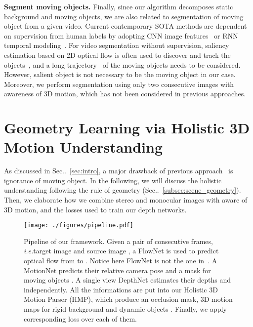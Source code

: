 \documentclass[runningheads]{llncs}
\makeatletter
\newcommand{\secref}[1]{Sec\onedot~\ref{#1}}
\DeclareRobustCommand\onedot{\futurelet\@let@token\@onedot}
\def\onedot{\ifx\@let@token.\else.\null\fi\xspace}
\def\ie{\emph{i.e.}}
\makeatother
\begin{document}
\noindent\textbf{Segment moving objects.}
Finally, since our algorithm decomposes static background and moving objects, we are also related to segmentation of moving object from a given video. 
Current contemporary SOTA methods are dependent on supervision from human labels by adopting CNN image features~\cite{fragkiadaki2015learning,yoon2017pixel} or RNN temporal modeling~\cite{tokmakov2017learning}. 
For video segmentation without supervision, saliency estimation based on 2D optical flow is often used to discover and track the objects~\cite{wang2018saliency,faktor2014video,yang2017spatio}, and a long trajectory~\cite{brox2010object,kim2018face} of the moving objects needs to be considered. However, salient object is not necessary to be the moving object in our case. Moreover, we perform segmentation using only two consecutive images with awareness of 3D motion, which has not been considered in previous approaches. 










 
\section{Geometry Learning via Holistic 3D Motion Understanding}
\label{sec:approach}
As discussed in \secref{sec:intro}, a major drawback of previous approach~\cite{zhou2017unsupervised,yang2018cvpr} is ignorance of moving object. In the following, we will discuss the holistic understanding following the rule of geometry (\secref{subsec:scene_geometry}). Then, we elaborate how we combine stereo and monocular images with aware of 3D motion, and the losses used to train our depth networks.



\begin{figure*}[t]
\centering
\texttt{[image: ./figures/pipeline.pdf]}
\caption{Pipeline of our framework. Given a pair of consecutive frames, \ie target image  and source image , a FlowNet is used to predict optical flow  from  to . Notice here FlowNet is not the one in~\cite{IMKDB17}.
A MotionNet predicts their relative camera pose  and a mask for moving objects . A single view DepthNet estimates their depths  and  independently. All the informations are put into our Holistic 3D Motion Parser (HMP), which produce an occlusion mask, 3D motion maps for rigid background  and dynamic objects . Finally, we apply corresponding loss over each of them.}
\label{fig:pipeline}
\vspace{-0.5\baselineskip}
\end{figure*}
\end{document}
